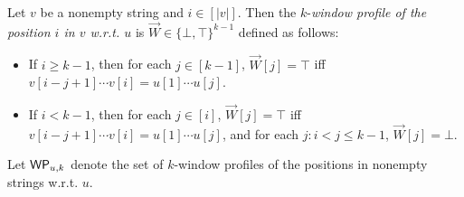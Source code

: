 %
%
%


\begin{definition}
Let $v$ be a nonempty string and $i \in [|v|]$. Then the $k$-\emph{window profile of the position $i$ in $v$ w.r.t. $u$} is $\overrightarrow{W}  \in \{\bot,\top\}^{k-1}$ defined as follows:
\begin{itemize}
\item If $i \ge k-1$, then for each $j \in [k-1]$, $\overrightarrow{W}[j] = \top$ iff $v[i-j+1] \cdots v[i]=u[1] \cdots u[j]$.
%
\item If $i < k-1$, then for each $j \in [i]$, $\overrightarrow{W}[j] = \top$ iff $v[i-j+1] \cdots v[i]=u[1] \cdots u[j]$, and for each $j: i < j \le k-1$, $\overrightarrow{W}[j] = \bot$.
\end{itemize}
Let $\mathsf{WP}_{u, k}$ denote the set of $k$-window profiles of the positions in nonempty strings w.r.t. $u$.
\end{definition}

